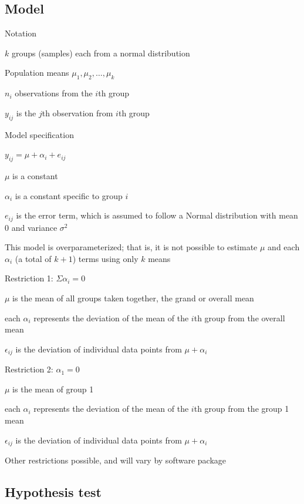 \subsection{Model}
\bi
\item Notation
  \bi 
   \item $k$ groups (samples) each from a normal distribution
   \item Population means $\mu_{1}, \mu_{2}, \ldots, \mu_{k}$
   \item $n_i$ observations from the $i$th group
   \item $y_{ij}$ is the $j$th observation from $i$th group
  \ei
\item Model specification
  \bi
    \item $y_{ij} = \mu + \alpha_i + e_{ij}$
    \item $\mu$ is a constant
    \item $\alpha_i$ is a constant specific to group $i$
    \item $e_{ij}$ is the error term, which is assumed to follow a Normal distribution with mean 0 and variance $\sigma^2$
    \item This model is overparameterized; that is, it is not possible to estimate $\mu$ and each $\alpha_i$ (a total of $k + 1$) terms using only $k$ means
  \ei
\item Restriction 1: $\Sigma \alpha_i = 0$
  \bi
    \item $\mu$ is the mean of all groups taken together, the grand or overall mean
    \item each $\alpha_i$ represents the deviation of the mean of the $i$th group from the overall mean
    \item $\epsilon_{ij}$ is the deviation of individual data points from $\mu + \alpha_i$ 
  \ei
\item Restriction 2: $\alpha_1 = 0$
  \bi
    \item $\mu$ is the mean of group 1
    \item each $\alpha_i$ represents the deviation of the mean of the $i$th group from the group 1 mean
    \item $\epsilon_{ij}$ is the deviation of individual data points from $\mu + \alpha_i$
  \ei
\item Other restrictions possible, and will vary by software package
\ei

\subsection{Hypothesis test}

